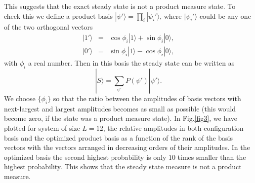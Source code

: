\documentclass[11pt,a4paper]{book}
\begin{document}
This suggests that the
exact steady state is not a product measure state. To check this we define a 
product basis $|\psi'\rangle =
\displaystyle\prod_i|\psi_i'\rangle$,
where $|\psi_i'\rangle$ could be any one of the two orthogonal vectors
\begin{eqnarray}
  |1'\rangle &=& \cos\phi_i|1\rangle + \sin\phi_i|0\rangle, \nonumber \\
  |0'\rangle &=& \sin\phi_i|1\rangle - \cos\phi_i|0\rangle,
\end{eqnarray}
with $\phi_i$ a real number. Then in this basis the steady state can
be written as
\begin{equation}
  |S\rangle = \sum_{\psi'} P(\psi')|\psi'\rangle.
\end{equation}
We choose $\{\phi_i\}$ so that the ratio between the amplitudes
of basis vectors with next-largest and largest 
amplitudes becomes as small as possible (this would become zero, 
if the state was a product measure state). 
In Fig.\ref{fig3}, we have plotted for system of 
size $L=12$, the relative amplitudes in both configuration
basis and the optimized product basis
as a function of the rank of the basis vectors with the vectors
arranged in decreasing orders of their amplitudes. In the
optimized basis the second highest probability is only $10$ times
smaller than the highest probability. This shows that the steady
state measure is not a product measure.
\end{document}
